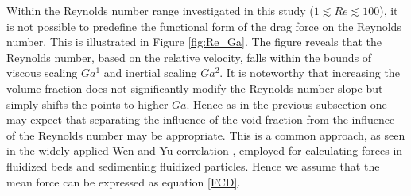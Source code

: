 Within the Reynolds number range investigated in this study ($1 \lesssim Re \lesssim 100$), it is not possible to predefine the functional form of the drag force on the Reynolds number. This is illustrated in Figure \ref{fig:Re_Ga}. The figure reveals that the Reynolds number, based on the relative velocity, falls within the bounds of viscous scaling $Ga^1$ and inertial scaling $Ga^2$. It is noteworthy that increasing the volume fraction does not significantly modify the Reynolds number slope but simply shifts the points to higher $Ga$. Hence as in the previous subsection one may expect that separating the influence of the void fraction from the influence of the Reynolds number may be appropriate. This is a common approach, as seen in the widely applied Wen and Yu correlation \citep{wen1966}, employed for calculating forces in fluidized beds and sedimenting fluidized particles. Hence we assume that the mean force can be expressed as equation \ref{FCD}.



 






